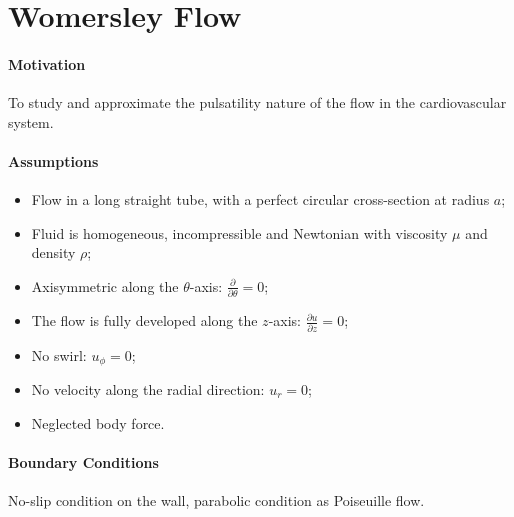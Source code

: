 \documentclass[a4paper]{article}
\begin{document}
\section{Womersley Flow}
\paragraph{Motivation}  To study and approximate the pulsatility nature of the flow in the cardiovascular system.

\paragraph{Assumptions}
\begin{itemize}
    \item Flow in a long straight tube, with a perfect circular cross-section at radius $a$;

    \item Fluid is homogeneous, incompressible and Newtonian with viscosity $\mu$ and density $\rho$;
    
    \item Axisymmetric along the $\theta$-axis: $\displaystyle \frac{\partial}{\partial \theta}=0$; 

    \item The flow is fully developed along the $z$-axis: $\displaystyle \frac{\partial u}{\partial z}=0$; 

    \item No swirl: $u_{\phi}=0$;

    \item No velocity along the radial direction: $u_r = 0$;

    \item Neglected body force.
\end{itemize}

\paragraph{Boundary Conditions} No-slip condition on the wall, parabolic condition as Poiseuille flow.
\end{document}
